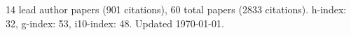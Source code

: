14 lead author papers (901 citations),
60 total papers (2833 citations).\newline
h-index: 32, g-index: 53, i10-index: 48. Updated \today.